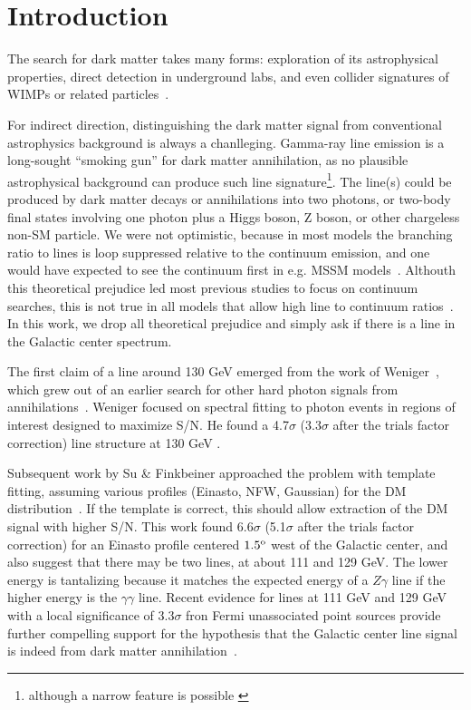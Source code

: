 \documentclass[aps,twocolumn,prd,superscriptaddress,showpacs,nofootinbib,fixfloat]{revtex4}
\newcommand{\degree}{^{\rm o}}
\begin{document}
\section{Introduction}



The search for dark matter takes many forms: exploration of
its astrophysical properties, direct detection in
underground labs, and even collider signatures of WIMPs or
related
particles~\citep{Jungman:1995df,Bergstrom:2000,Bertone:2005,
Hooper:2007Review, 2012arXiv1205.4882B}.

For indirect direction, distinguishing the dark matter
signal from conventional astrophysics background is always a
chanlleging. Gamma-ray line emission is a long-sought
``smoking gun'' for dark matter annihilation, as no
plausible astrophysical background can produce such line
signature\footnote{although a narrow feature is possible
\citep[see][]{2012arXiv1207.0458A}}.  The line(s) could be
produced by dark matter decays or annihilations into two
photons, or two-body final states involving one photon plus
a Higgs boson, Z boson, or other chargeless non-SM
particle. We were not optimistic, because in most models the
branching ratio to lines is loop suppressed relative to the
continuum emission, and one would have expected to see the
continuum first in e.g. MSSM
models~\citep[e.g.][]{Bergstrom:1997}.  Althouth this
theoretical prejudice led most previous studies to focus on
continuum searches, this is not true in all models that
allow high line to continuum
ratios~\citep[e.g.][]{Bergstrom:1998,Bergstrom:2000,Bertone:2009,Jackson:2010,Cline:2012,Weiner:2012}.
In this work, we drop all theoretical prejudice and simply
ask if there is a line in the Galactic center spectrum.

The first claim of a line around 130 GeV emerged from the
work of Weniger~\citep{Weniger:2012}, which grew out of an
earlier search for other hard photon signals from
annihilations~\citep{Bringmann:2012}.  Weniger focused on
spectral fitting to photon events in regions of interest
designed to maximize S/N.  He found a 4.7$\sigma$
(3.3$\sigma$ after the trials factor correction) line
structure at 130 GeV .

Subsequent work by Su \& Finkbeiner approached the problem
with template fitting, assuming various profiles (Einasto,
NFW, Gaussian) for the DM distribution~\citep{linepaper}.
If the template is correct, this should allow extraction of
the DM signal with higher S/N.  This work found 6.6$\sigma$
(5.1$\sigma$ after the trials factor correction) for an
Einasto profile centered $1.5\degree$ west of the Galactic
center, and also suggest that there may be two lines, at
about 111 and 129 GeV.  The lower energy is tantalizing
because it matches the expected energy of a $Z\gamma$ line
if the higher energy is the $\gamma\gamma$ line.  Recent
evidence for lines at 111 GeV and 129 GeV with a local
significance of $3.3\sigma$ fron Fermi unassociated point
sources provide further compelling support for the
hypothesis that the Galactic center line signal is indeed
from dark matter annihilation~\cite{doubleline}.
\end{document}
